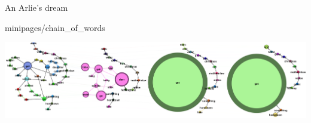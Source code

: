 \documentclass[xcolor=x11names,compress]{beamer}
\begin{document}
{
\begin{frame}[t]{An Arlie's dream}
    \vspace{-0.2cm}
    
    
     {minipages/chain_of_words}
    
    \begin{minipage}[t]{\textwidth}
        \hspace{-0.7cm}
        \includegraphics[width=1.1\textwidth]{immagini/arlie_80_ml}
    \end{minipage}
\end{frame}}
\end{document}
